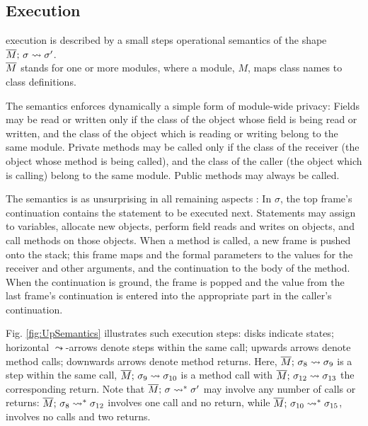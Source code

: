   

  
\subsection{\LangOO Execution}
\label{sect:execution}

 \LangOO execution is described by a small steps operational semantics of the shape $\overline{M};\, \sigma \leadsto {\sigma'}$.\\
  $\overline{M}$ stands for one or more modules, where a
  module,  $M$, maps class names to class definitions. 
   
{The semantics enforces dynamically a simple form of module-wide privacy: 
Fields may be read or written only if the class of the object whose field is being read or written, and the class of the object which is reading or writing belong to the same module.}
Private methods may be called only if the class of the receiver (the object whose method is being called), and the class of the caller (the object which is calling) belong to the same module.
Public methods may always be called.

The semantics is as unsurprising in all remaining aspects  :  
In $\sigma$, the  top frame's continuation contains the statement to be  executed next.  
 Statements may assign to variables, allocate new objects, 
perform field reads and writes on objects, and
 call methods on those objects. 
When a method is called, a new frame is pushed onto the stack; this frame  maps  and the formal parameters to  the values for the receiver and other arguments, and the continuation to the body of the method.  When the continuation is ground, the frame is popped and the value from the last frame's continuation is entered into the appropriate part in the caller's continuation. 


{Fig. \ref{fig:UpSemantics} illustrates  such  execution steps:  disks indicate states;
 horizontal $\leadsto$-arrows denote   steps  within the same  call; upwards arrows denote  method calls;
 downwards arrows denote method returns. %
 Here,   $\overline{M};\, \sigma_8 \leadsto {\sigma_9} $ is a step within the same call, $\overline{M};\, \sigma_9 \leadsto {\sigma_{10}} $ is a method call   
with $\overline{M};\, \sigma_{12} \leadsto {\sigma_{13}} $ %
the corresponding return. 
 {Note that  $\overline{M};\, \sigma \leadsto^* {\sigma'}$ may involve  any number of  calls or returns: 
 $\overline{M};\, \sigma_8 \leadsto^* {\sigma_{12}}$ involves one call and no return,
while $\overline{M};\, \sigma_{10} \leadsto^* {\sigma_{15}}$,   involves no calls and two returns.
}
} 


